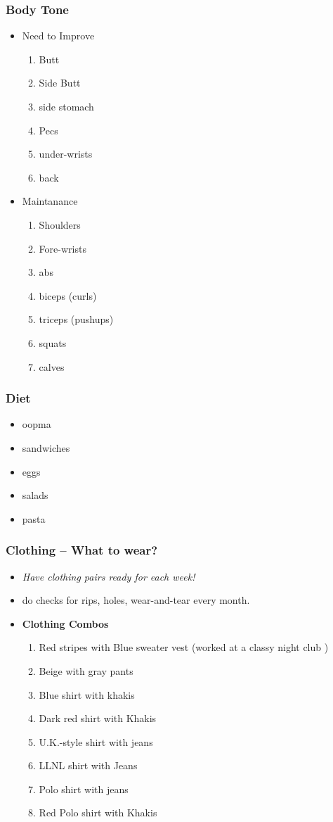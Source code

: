 \begin{frame} 
\frametitle{Body Tone}
\begin{itemize}
\item Need to Improve 
\begin{enumerate}
\item \tiny Butt 
\item  \tiny Side Butt
\item \tiny side stomach
\item \tiny Pecs
\item \tiny under-wrists
\item \tiny back 
\end{enumerate} 
\item Maintanance  
\begin{enumerate}
\item \tiny Shoulders
\item \tiny Fore-wrists
\item \tiny abs
\item \tiny biceps (curls)
\item \tiny triceps (pushups)
\item \tiny squats
\item \tiny calves
\end{enumerate} 
\end{itemize} 
\end{frame} 

\begin{frame} 
\frametitle{Diet} 
\begin{itemize} 
\item oopma 
\item sandwiches
\item eggs
\item salads 
\item pasta
\end{itemize} 
\end{frame} 

\begin{frame}
\frametitle{Clothing -- What to wear?} 
\begin{itemize}
\item \tiny \textit{Have clothing pairs ready for each week!}
\item \tiny do checks for rips, holes, wear-and-tear every month. 
\item \tiny \textbf{Clothing Combos}  
\begin{enumerate}
\item \tiny Red stripes with Blue sweater vest (worked at a classy night club  )
\item \tiny Beige with gray pants
\item \tiny Blue shirt with khakis
\item \tiny Dark red shirt with Khakis
\item \tiny U.K.-style shirt with jeans
\item \tiny LLNL shirt with Jeans
\item \tiny Polo shirt with jeans
\item \tiny Red Polo shirt with Khakis
\end{enumerate} 
\end{itemize}
\end{frame} 

